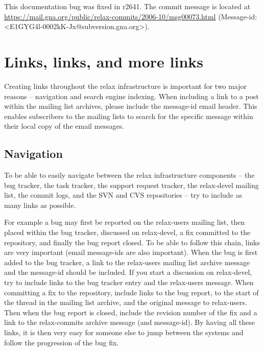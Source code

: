 \begin{exampleenv}
This documentation bug was fixed in r2641. The commit message is located at \href{https://mail.gna.org/public/relax-commits/2006-10/msg00073.html}{https://mail.gna.org/public/relax-commits/2006-10/msg00073.html} (Message-id: <E1GYG4l-0002kK-Jx@subversion.gna.org>).
\end{exampleenv}




\section{Links, links, and more links}

Creating links throughout the relax infrastructure is important for two major reasons -- navigation and search engine indexing.
When including a link to a post within the mailing list archives, please include the message-id email header.
This enables subscribers to the mailing lists to search for the specific message within their local copy of the email messages.



\subsection{Navigation}

To be able to easily navigate between the relax infrastructure components -- the bug tracker, the task tracker, the support request tracker, the relax-devel mailing list, the commit logs, and the SVN and CVS repositories -- try to include as many links as possible.

For example a bug may first be reported on the relax-users mailing list, then placed within the bug tracker, discussed on relax-devel, a fix committed to the repository, and finally the bug report closed.
To be able to follow this chain, links are very important (email message-ids are also important).
When the bug is first added to the bug tracker, a link to the relax-users mailing list archive message and the message-id should be included.
If you start a discussion on relax-devel, try to include links to the bug tracker entry and the relax-users message.
When committing a fix to the repository, include links to the bug report, to the start of the thread in the mailing list archive, and the original message to relax-users.
Then when the bug report is closed, include the revision number of the fix and a link to the relax-commits archive message (and message-id).
By having all these links, it is then very easy for someone else to jump between the systems and follow the progression of the bug fix.

